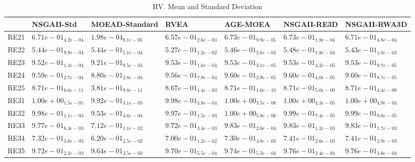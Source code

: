 \documentclass{article}
\begin{document}
\begin{table}
\caption{HV. Mean and Standard Deviation}
\label{table: HV}
\centering
\begin{scriptsize}
\begin{tabular}{lllllll}
\hline & NSGAII-Std & MOEAD-Standard & RVEA & AGE-MOEA & NSGAII-RE3D &  NSGAII-RWA3D\\
\hline 
RE21 & $  6.71e-01_{ 4.2e-04}$ & $  1.98e-04_{ 8.1e-05}$ & $  6.57e-01_{ 2.6e-03}$ & \cellcolor{gray95}$  6.73e-01_{ 9.9e-05}$ & \cellcolor{gray25}$  6.73e-01_{ 1.8e-04}$ & $  6.71e-01_{ 4.8e-04}$ \\
RE22 & $  5.44e-01_{ 9.9e-04}$ & $  5.44e-01_{ 5.1e-04}$ & $  5.27e-01_{ 1.2e-02}$ & \cellcolor{gray25}$  5.46e-01_{ 2.6e-03}$ & \cellcolor{gray95}$  5.48e-01_{ 1.8e-04}$ & $  5.43e-01_{ 1.0e-03}$ \\
RE23 & $  9.52e-01_{ 1.4e-04}$ & $  9.21e-01_{ 9.5e-04}$ & \cellcolor{gray25}$  9.53e-01_{ 1.6e-04}$ & $  9.53e-01_{ 3.1e-05}$ & \cellcolor{gray95}$  9.53e-01_{ 4.2e-05}$ & $  9.53e-01_{ 9.7e-05}$ \\
RE24 & $  9.59e-01_{ 2.7e-04}$ & $  8.80e-01_{ 2.8e-04}$ & $  9.56e-01_{ 7.9e-04}$ & \cellcolor{gray95}$  9.60e-01_{ 2.9e-05}$ & \cellcolor{gray25}$  9.60e-01_{ 4.0e-05}$ & $  9.60e-01_{ 8.7e-05}$ \\
RE25 & \cellcolor{gray25}$  8.71e-01_{ 8.6e-11}$ & $  3.81e-01_{ 9.8e-11}$ & $  8.67e-01_{ 1.4e-03}$ & \cellcolor{gray95}$  8.71e-01_{ 1.0e-10}$ & $  8.71e-01_{ 5.0e-09}$ & $  8.71e-01_{ 4.4e-09}$ \\
RE31 & \cellcolor{gray25}$  1.00e+00_{ 1.5e-05}$ & $  9.92e-01_{ 3.1e-05}$ & $  9.98e-01_{ 5.8e-04}$ & \cellcolor{gray95}$  1.00e+00_{ 3.5e-08}$ & $  1.00e+00_{ 4.3e-05}$ & $  1.00e+00_{ 4.9e-04}$ \\
RE32 & $  9.98e-01_{ 1.1e-03}$ & $  9.53e-01_{ 4.6e-04}$ & $  9.97e-01_{ 1.5e-03}$ & \cellcolor{gray95}$  1.00e+00_{ 5.0e-06}$ & \cellcolor{gray25}$  9.99e-01_{ 7.4e-05}$ & $  9.99e-01_{ 9.8e-05}$ \\
RE33 & $  9.77e-01_{ 8.3e-03}$ & $  7.12e-01_{ 1.1e-02}$ & $  9.72e-01_{ 3.4e-03}$ & \cellcolor{gray95}$  9.83e-01_{ 2.0e-04}$ & $  9.83e-01_{ 1.2e-03}$ & \cellcolor{gray25}$  9.83e-01_{ 1.7e-03}$ \\
RE34 & $  7.32e-01_{ 3.6e-03}$ & $  6.20e-01_{ 2.5e-02}$ & $  7.00e-01_{ 1.2e-02}$ & $  7.30e-01_{ 4.8e-03}$ & \cellcolor{gray25}$  7.41e-01_{ 2.6e-03}$ & \cellcolor{gray95}$  7.41e-01_{ 2.9e-03}$ \\
RE35 & $  9.72e-01_{ 2.3e-03}$ & $  9.64e-01_{ 2.5e-03}$ & $  9.70e-01_{ 5.5e-04}$ & $  9.74e-01_{ 5.3e-04}$ & \cellcolor{gray95}$  9.76e-01_{ 2.4e-04}$ & \cellcolor{gray25}$  9.76e-01_{ 3.8e-04}$ \\

\end{tabular}
\end{scriptsize}
\end{table}
\end{document}
